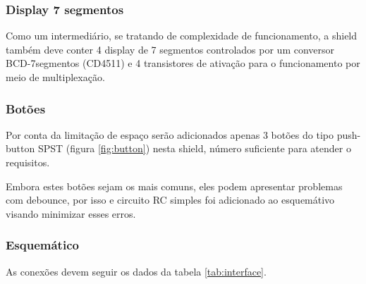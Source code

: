 \subsubsection*{Display 7 segmentos}

Como um intermediário, se tratando de complexidade de funcionamento, a shield também deve conter 4 display de 7 segmentos controlados por um conversor BCD-7segmentos (CD4511) e 4 transistores de ativação para o funcionamento por meio de multiplexação.

\subsubsection*{Botões}

Por conta da limitação de espaço serão adicionados apenas 3 botões do tipo push-button SPST (figura \ref{fig:button}) nesta shield, número suficiente para atender o requisitos.

Embora estes botões sejam os mais comuns, eles podem apresentar problemas com debounce, por isso e circuito RC simples foi adicionado ao esquemátivo visando minimizar esses erros.

\subsubsection{Esquemático}

As conexões devem seguir os dados da tabela \ref{tab:interface}.

